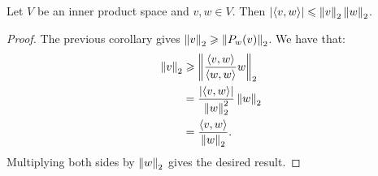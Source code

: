     \begin{lemma}\label{lemma:c-s-ineq}
        Let $V$ be an inner product space and $v,w \in V$. Then $|\langle v,w \rangle| \leqslant \left\lVert v \right\rVert_2 \left\lVert w \right\rVert_2$.
    \end{lemma}
        \begin{proof}
            The previous corollary gives $\left\lVert v \right\rVert_2 \geqslant \left\lVert P_w(v) \right\rVert_2$. We have that:
                \begin{equation*}
                \begin{split}
                    \left\lVert v \right\rVert_2 
                    & \geqslant \left\lVert \frac{\langle v,w \rangle}{\langle w,w \rangle}w \right\rVert_2 \\
                    & = \frac{|\langle v,w \rangle|}{\left\lVert w \right\rVert_2^2}\left\lVert w \right\rVert_2 \\
                    & = \frac{\langle v,w \rangle}{\left\lVert w \right\rVert_2}.
                \end{split}
                \end{equation*}
            Multiplying both sides by $\left\lVert w \right\rVert_2$ gives the desired result.
        \end{proof}


